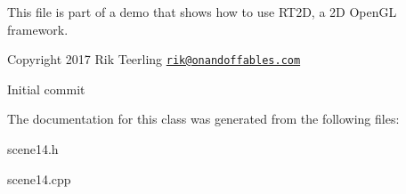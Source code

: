 This file is part of a demo that shows how to use R\+T2D, a 2D Open\+GL framework.


\begin{DoxyItemize}
\item Copyright 2017 Rik Teerling \href{mailto:rik@onandoffables.com}{\tt rik@onandoffables.\+com}
\begin{DoxyItemize}
\item Initial commit 
\end{DoxyItemize}
\end{DoxyItemize}

The documentation for this class was generated from the following files\+:\begin{DoxyCompactItemize}
\item 
scene14.\+h\item 
scene14.\+cpp\end{DoxyCompactItemize}

